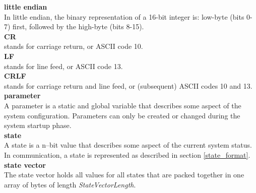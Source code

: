 \documentclass[letterpaper,oneside,12pt]{book}
\begin{document}
\textbf{little endian} \\
In little endian, the binary representation of a 16-bit integer is: low-byte (bits 0-7)
first, followed by the high-byte (bits 8-15).
\\[2ex]
\textbf{CR} \\
stands for carriage return, or {ASCII} code 10.
\\[2ex]
\textbf{LF} \\
stands for line feed, or {ASCII} code 13.
\\[2ex]
\textbf{CRLF} \\
stands for carriage return and line feed, or (subsequent) {ASCII} codes 10 and 13.
\\[2ex]
\textbf{parameter} \\
A parameter is a static and global variable that describes some aspect of the 
system configuration. Parameters can only be created or changed during the 
system startup phase.
\\[2ex]
\textbf{state} \\
A state is a n--bit value that describes some aspect of the current system 
status. In communication, a state is represented as described in section
\ref{state_format}.
\\[2ex]
\textbf{state vector} \\
The state vector holds all values for all states that are packed together in one
array of bytes of length \textit{StateVectorLength}.


\backmatter
\end{document}
